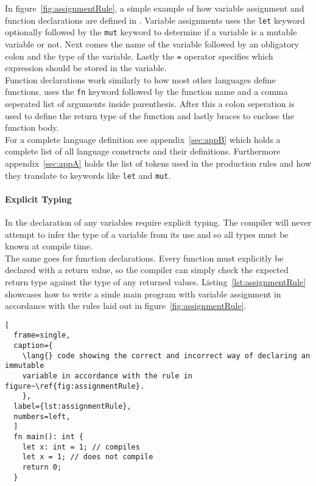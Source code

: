 In figure~\ref{fig:assignmentRule}, a simple example of how
variable assignment and function declarations are defined in \lang. Variable
assignments uses the
\texttt{let} keyword optionally followed by the \texttt{mut} keyword to determine if
a variable is a mutable variable or not. Next comes the name of the variable
followed by an obligatory colon and the type of the variable. Lastly the
\texttt{=} operator specifies which expression should be stored in the variable. \\

Function declarations work similarly to how most other languages define functions.
\lang{} uses the \texttt{fn} keyword followed by the function name and a comma
seperated list of arguments inside parenthesis. After this a colon
seperation is used to define the return type of the function and lastly braces to enclose
the function body. \\

For a complete language definition see appendix~\ref{sec:appB} which holds a
complete list of all language constructs and their definitions. Furthermore
appendix~\ref{sec:appA} holds the list of tokens used in the production rules and how
they translate to keywords like \texttt{let} and \texttt{mut}.


\paragraph{Explicit Typing} \hfill
\vspace{0.1em}

In \lang{} the declaration of any variables require explicit typing. The compiler
will never attempt to infer the type of a variable from its use and so all types
must be known at compile time.\\

The same goes for function declarations. Every function must explicitly be declared
with a return value, so the compiler can simply check the expected return type
against the type of any returned values. Listing~\ref{lst:assignmentRule} showcases
how to write a simle main program with variable assignment in accordance with the
rules laid out in figure~\ref{fig:assignmentRule}.

\begin{lstlisting}[
  frame=single,
  caption={
    \lang{} code showing the correct and incorrect way of declaring an immutable
    variable in accordance with the rule in figure~\ref{fig:assignmentRule}.
    },
  label={lst:assignmentRule},
  numbers=left,
  ]
  fn main(): int {
    let x: int = 1; // compiles
    let x = 1; // does not compile
    return 0;
  }
\end{lstlisting}

